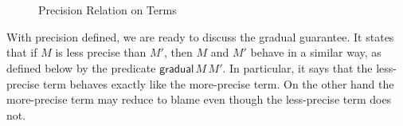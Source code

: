 \begin{figure}[tbp]
\begin{code}
\AgdaSpace{}%
\AgdaSpace{}%
\AgdaSymbol{\}\{}\AgdaSpace{}%
\AgdaSymbol{:}\AgdaSpace{}%
\AgdaSpace{}%
\AgdaSpace{}%
\AgdaSpace{}%
\AgdaSpace{}%
\AgdaSymbol{\}}\<%
\\
\>[2][@{}l@{\AgdaIndent{0}}]%
\>[5]\AgdaSpace{}%
\AgdaSpace{}%
\AgdaSpace{}%
\AgdaSpace{}%
\AgdaSpace{}%
\AgdaSpace{}%
\AgdaSpace{}%
%
\>[29]%
\>[32]\AgdaSpace{}%
\AgdaSpace{}%
\AgdaSpace{}%
\AgdaSpace{}%
\AgdaSpace{}%
\AgdaSpace{}%
\AgdaSpace{}%
%
\>[51]\AgdaSpace{}%
\<%
\\
%
\>[2]\AgdaSpace{}%
\AgdaSymbol{:}\AgdaSpace{}%
\AgdaSpace{}%
\AgdaSpace{}%
\AgdaSymbol{\}}%
\>[22]%
\>[25]\AgdaSpace{}%
\AgdaSpace{}%
\AgdaSpace{}%
\AgdaSpace{}%
\AgdaSpace{}%
\AgdaSpace{}%
%
\>[46]%
\>[49]\AgdaSpace{}%
\AgdaSpace{}%
\AgdaSpace{}%
\AgdaSpace{}%
\AgdaSpace{}%
\AgdaSpace{}%
\AgdaSymbol{\{}\AgdaSymbol{\}}\<%
\end{code}
\caption{Precision Relation on Terms}
\label{fig:term-precision}
\end{figure}

With precision defined, we are ready to discuss the gradual guarantee.
It states that if $M$ is less precise than $M′$, then $M$ and $M′$
behave in a similar way, as defined below by the predicate
$\mathsf{gradual}\,M\,M′$. In particular, it says that the
less-precise term behaves exactly like the more-precise term. On the
other hand the more-precise term may reduce to \textsf{blame} even
though the less-precise term does not.

